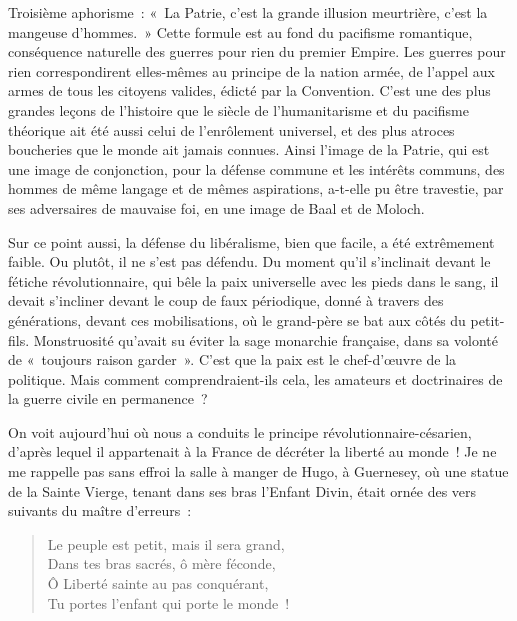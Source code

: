 \documentclass[french,twoside]{book} %
\begin{document}
Troisième aphorisme : « La Patrie, c’est la grande illusion meurtrière, c’est la mangeuse d’hommes. » Cette formule est au fond du pacifisme romantique, conséquence naturelle des guerres pour rien du premier Empire. Les guerres pour rien correspondirent elles-mêmes au principe de la nation armée, de l’appel aux armes de tous les citoyens valides, édicté par la Convention. C’est une des plus grandes leçons de l’histoire que le siècle de l’humanitarisme et du pacifisme théorique ait été aussi celui de l’enrôlement universel, et des plus atroces boucheries que le monde ait jamais connues. Ainsi l’image de la Patrie, qui est une image de conjonction, pour la défense commune et les intérêts communs, des hommes de même langage et de mêmes aspirations, a-t-elle pu être travestie, par ses adversaires de mauvaise foi, en une image de Baal et de Moloch.\par
Sur ce point aussi, la défense du libéralisme, bien que facile, a été extrêmement faible. Ou plutôt, il ne s’est pas défendu. Du moment qu’il s’inclinait devant le fétiche révolutionnaire, qui bêle la paix universelle avec les pieds dans le sang, il devait s’incliner devant le coup de faux périodique, donné à travers des générations, devant ces mobilisations, où le grand-père se bat aux côtés du petit-fils. Monstruosité qu’avait su éviter la sage monarchie française, dans sa volonté de « toujours raison garder ». C’est que la paix est le chef-d’œuvre de la politique. Mais comment comprendraient-ils cela, les amateurs et doctrinaires de la guerre civile en permanence ?\par
On voit aujourd’hui où nous a conduits le principe révolutionnaire-césarien, d’après lequel il appartenait à la France de décréter la liberté au monde ! Je ne me rappelle pas sans effroi la salle à manger de Hugo, à Guernesey, où une statue de la Sainte Vierge, tenant dans ses bras l’Enfant Divin, était ornée des vers suivants du maître d’erreurs :\par


\begin{verse}
Le peuple est petit, mais il sera grand,\\
Dans tes bras sacrés, ô mère féconde,\\
Ô Liberté sainte au pas conquérant,\\
Tu portes l’enfant qui porte le monde !\\
\end{verse}
\end{document}
